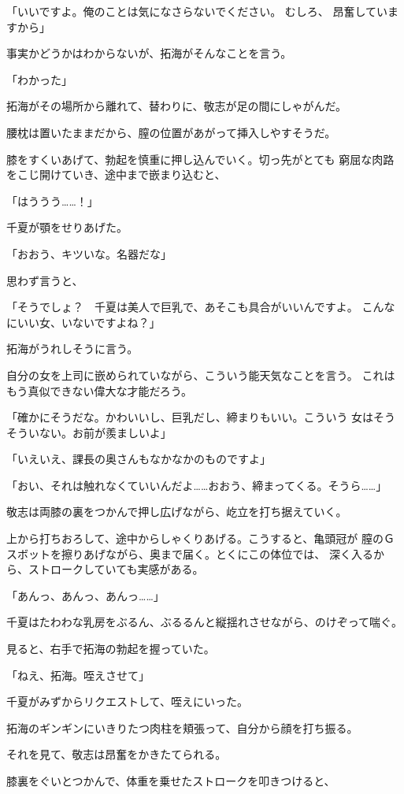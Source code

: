 ﻿\documentclass[
    book,tate,
    line_length=30zw,
    jafontsize=12pt,
    paper=b5j,
    landscape,
    ]{jlreq}
\begin{document}
「いいですよ。俺のことは気になさらないでください。 むしろ、
昂奮していますから」

事実かどうかはわからないが、拓海がそんなことを言う。

「わかった」

拓海がその場所から離れて、替わりに、敬志が足の間にしゃがんだ。

腰枕は置いたままだから、膣の位置があがって挿入しやすそうだ。

膝をすくいあげて、勃起を慎重に押し込んでいく。切っ先がとても
窮屈な肉路をこじ開けていき、途中まで嵌まり込むと、

「はううう……！」

千夏が顎をせりあげた。

「おおう、キツいな。名器だな」

思わず言うと、

「そうでしょ？　千夏は美人で巨乳で、あそこも具合がいいんですよ。
こんなにいい女、いないですよね？」

拓海がうれしそうに言う。

自分の女を上司に嵌められていながら、こういう能天気なことを言う。
これはもう真似できない偉大な才能だろう。

「確かにそうだな。かわいいし、巨乳だし、締まりもいい。こういう
女はそうそういない。お前が羨ましいよ」

「いえいえ、課長の奥さんもなかなかのものですよ」

「おい、それは触れなくていいんだよ……おおう、締まってくる。そうら……」

敬志は両膝の裏をつかんで押し広げながら、屹立を打ち据えていく。

上から打ちおろして、途中からしゃくりあげる。こうすると、亀頭冠が
膣のＧスボットを擦りあげながら、奥まで届く。とくにこの体位では、
深く入るから、ストロークしていても実感がある。

「あんっ、あんっ、あんっ……」

千夏はたわわな乳房をぶるん、ぶるるんと縦揺れさせながら、のけぞって喘ぐ。

見ると、右手で拓海の勃起を握っていた。

「ねえ、拓海。咥えさせて」

千夏がみずからリクエストして、咥えにいった。

拓海のギンギンにいきりたつ肉柱を頬張って、自分から顔を打ち振る。

それを見て、敬志は昂奮をかきたてられる。

膝裏をぐいとつかんで、体重を乗せたストロークを叩きつけると、
\end{document}

